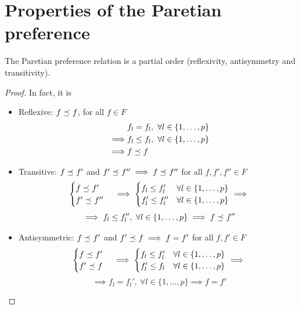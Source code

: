 \section{Properties of the Paretian preference}
\label{sec:paretoproperties}

\begin{theo}
	The Paretian preference relation is a partial order (reflexivity, antisymmetry and transitivity).
\end{theo}

\begin{proof}
	In fact, it is
	\begin{itemize}
		\item Reflexive: $f \preceq_{} f$, for all $f \in F$
		\begin{align*}
			&f_l = f_l, \ \forall l \in \{1, \dots, p\}  \\
			\implies & f_l \leq f_l, \ \forall l \in \{1, \dots, p\}  \\
			\implies & f \preceq_{} f
		\end{align*}
		
		\item Transitive: $f \preceq_{} f'$ and $f' \preceq_{} f'' \implies f \preceq_{} f''$ for all $f, f', f'' \in F$
		$$
		\begin{cases}
			f \preceq_{} f' \\
			f' \preceq_{} f''
		\end{cases}
		\implies \begin{cases}
			f_l \leq f_l' & \forall l \in \{1, \dots, p\} \\
			f_l' \leq f_l'' & \forall l \in \{1, \dots, p\}
		\end{cases}
		\implies 
		$$
		$$ \implies f_l \leq f_l'', \ \forall l \in \{1, \dots, p\} \implies f \preceq_{} f'' $$
		
		\item Antisymmetric: $f \preceq_{} f'$ and $f' \preceq_{} f \implies f = f'$ for all $f, f' \in F$
		$$ 
		\begin{cases}
			f \preceq_{} f' \\
			f' \preceq_{} f
		\end{cases}
		\implies \begin{cases}
			f_l \leq f_l' & \forall l \in \{1, \dots, p\} \\
			f_l' \leq f_l & \forall l \in \{1, \dots, p\}
		\end{cases}\implies 
		$$
		$$ \implies f_l = f_l', \ \forall l \in \{1, \dots, p\} \implies f = f' $$
	\end{itemize}
\end{proof}

